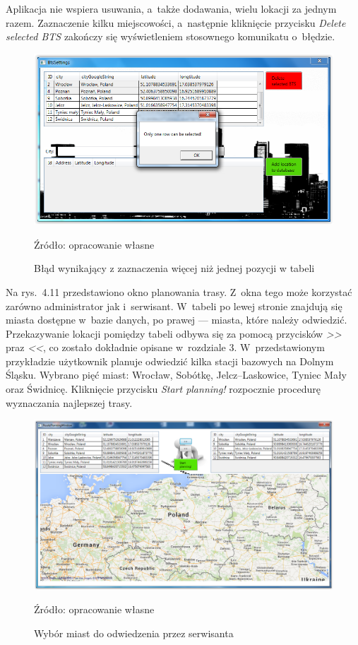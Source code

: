 \documentclass[12pt,a4paper]{report}
\begin{document}
Aplikacja nie wspiera usuwania, a~także dodawania, wielu lokacji za jednym razem. Zaznaczenie kilku miejscowości, a~następnie kliknięcie przycisku \textit{Delete selected BTS} zakończy się wyświetleniem stosownego komunikatu o~błędzie.  

\begin{figure}[!bht]
\centering
\includegraphics[scale=0.5]{Pictures/OneRowSelected.png}
\label{fig: OneRowSelected}
\caption{Błąd wynikający z zaznaczenia więcej niż jednej pozycji w tabeli}{Źródło: opracowanie własne}
\end{figure}
\newpage
Na rys.~4.11 przedstawiono okno planowania trasy. Z~okna tego może korzystać zarówno administrator jak i~serwisant. W~tabeli po lewej stronie znajdują się miasta dostępne w~bazie danych, po prawej --- miasta, które należy odwiedzić. Przekazywanie lokacji pomiędzy tabeli odbywa się za pomocą przycisków \textit{>>} praz \textit{<<}, co zostało dokładnie opisane w~rozdziale 3. W~przedstawionym przykładzie użytkownik planuje odwiedzić kilka stacji bazowych na Dolnym Śląsku. Wybrano pięć miast: Wrocław, Sobótkę, Jelcz--Laskowice, Tyniec Mały oraz Świdnicę. Kliknięcie przycisku \textit{Start planning!} rozpocznie procedurę wyznaczania najlepszej trasy.

\begin{figure}[!bht]
\centering
\includegraphics[scale=0.35]{Pictures/ChoosenCities.png}
\label{fig: ChoosenCities}
\caption{Wybór miast do odwiedzenia przez serwisanta}{Źródło: opracowanie własne}
\end{figure}
\end{document}
